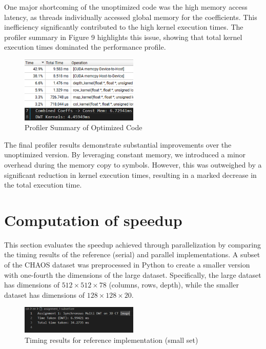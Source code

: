 \documentclass[journal,11pt]{IEEEtran}
\begin{document}
One major shortcoming of the unoptimized code was the high memory access latency, as threads individually accessed global memory for the coefficients. This inefficiency significantly contributed to the high kernel execution times. The profiler summary in Figure 9 highlights this issue, showing that total kernel execution times dominated the performance profile.

\begin{figure}[h] \centering \includegraphics[width=0.5\textwidth]{assets/optim-sum.png} \caption{Profiler Summary of Optimized Code} \label{fig:10} \end{figure}

The final profiler results demonstrate substantial improvements over the unoptimized version. By leveraging constant memory, we introduced a minor overhead during the memory copy to symbols. However, this was outweighed by a significant reduction in kernel execution times, resulting in a marked decrease in the total execution time.

\section{Computation of speedup}

This section evaluates the speedup achieved through parallelization by comparing the timing results of the reference (serial) and parallel implementations. A subset of the CHAOS dataset was preprocessed in Python to create a smaller version with one-fourth the dimensions of the large dataset. Specifically, the large dataset has dimensions of \(512 \times 512 \times 78\) (columns, rows, depth), while the smaller dataset has dimensions of \(128 \times 128 \times 20\).


\begin{figure}[h]
    \centering
    \includegraphics[width=0.5\textwidth]{assets/1-subset.png}
    \caption{Timing results for reference implementation (small set)}
    \label{fig:11}
\end{figure}
\end{document}
